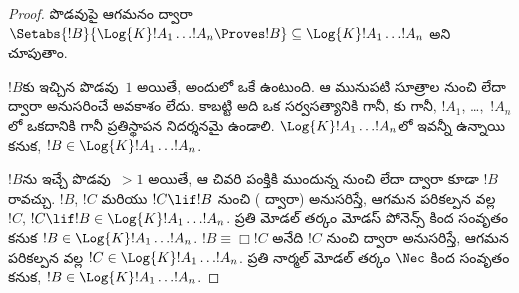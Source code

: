 \documentclass[../../../include/open-logic-section]{subfiles}
\begin{document}
\begin{proof}
   పొడవుపై ఆగమనం ద్వారా
  $\Setabs{!B}{\Log{K} !A_1 \dots !A_n \Proves !B} \subseteq
  \Log{K} !A_1 \dots !A_n$ అని చూపుతాం.

  $!B$కు ఇచ్చిన  పొడవు~$1$
  అయితే, అందులో ఒకే  ఉంటుంది.
  ఆ  మునుపటి సూత్రాల నుంచి
  \MP{} లేదా \Nec{} ద్వారా అనుసరించే అవకాశం లేదు. కాబట్టి అది
  ఒక సర్వసత్యానికి గానీ, కు గానీ,
  $!A_1$, \dots,~$!A_n$లో ఒకదానికి గానీ ప్రతిస్థాపన నిదర్శనమై ఉండాలి.
  $\Log{K}!A_1\dots!A_n$లో ఇవన్నీ ఉన్నాయి కనుక,
  $!B \in \Log{K}!A_1 \dots !A_n$.

  $!B$ను ఇచ్చే  పొడవు~$> 1$
  అయితే, ఆ  చివరి పంక్తికి
  ముందున్న  నుంచి
  \MP{} లేదా \Nec{} ద్వారా కూడా $!B$ రావచ్చు. $!B$, $!C$
  మరియు $!C \lif !B$ నుంచి (\MP{} ద్వారా) అనుసరిస్తే,
  ఆగమన పరికల్పన వల్ల $!C$, $!C \lif !B \in
  \Log{K}!A_1 \dots !A_n$. ప్రతి మోడల్ తర్కం మోడస్ పోనెన్స్
  కింద సంవృతం కనుక $!B \in \Log{K}!A_1 \dots
  !A_n$. $!B \equiv \Box !C$ అనేది $!C$ నుంచి \Nec{} ద్వారా
  అనుసరిస్తే, ఆగమన పరికల్పన వల్ల $!C
  \in \Log{K}!A_1 \dots !A_n$. ప్రతి నార్మల్ మోడల్ తర్కం
  $\Nec$ కింద సంవృతం కనుక, $!B \in
  \Log{K}!A_1\dots!A_n$.


\end{proof}
\end{document}
